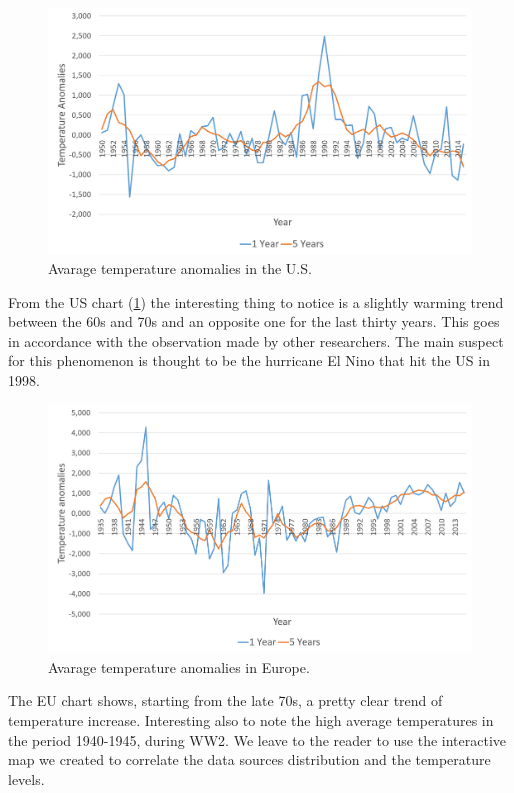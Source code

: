 \documentclass{vldb}
\begin{document}
\begin{figure}[tbh]
\includegraphics[width=1\linewidth]{UsAnomalies}
\caption{Avarage temperature anomalies in the U.S.}
\label{fig:UsAnomalies}
\end{figure}

From the US chart (\ref{fig:UsAnomalies}) the interesting thing to notice is a slightly warming trend between the 60s and 70s and an opposite one for the last thirty years. This goes in accordance with the observation made by other researchers\cite{hansen2006global}. The main suspect for this phenomenon is thought to be the hurricane El Nino that hit the US in 1998.

\begin{figure}[tbh]
\includegraphics[width=1\linewidth]{EuAnomalies}
\caption{Avarage temperature anomalies in Europe.}
\label{fig:EuAnomalies}
\end{figure}

The EU chart shows, starting from the late 70s, a pretty clear trend of temperature increase. Interesting also to note the high average temperatures in the period 1940-1945, during WW2. We leave to the reader to use the interactive map we created to correlate the data sources distribution and the temperature levels.
\end{document}
